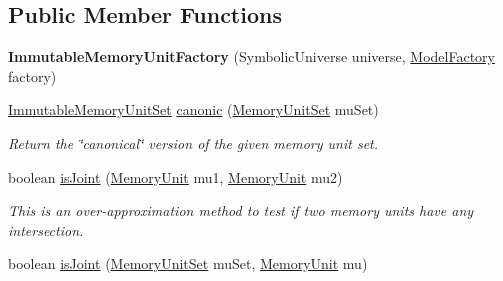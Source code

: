 \subsection*{Public Member Functions}
\begin{DoxyCompactItemize}
\item 
\hypertarget{classedu_1_1udel_1_1cis_1_1vsl_1_1civl_1_1state_1_1common_1_1immutable_1_1ImmutableMemoryUnitFactory_aa71d30215a0783c82208524f0b0f179e}{}{\bfseries Immutable\+Memory\+Unit\+Factory} (Symbolic\+Universe universe, \hyperlink{interfaceedu_1_1udel_1_1cis_1_1vsl_1_1civl_1_1model_1_1IF_1_1ModelFactory}{Model\+Factory} factory)\label{classedu_1_1udel_1_1cis_1_1vsl_1_1civl_1_1state_1_1common_1_1immutable_1_1ImmutableMemoryUnitFactory_aa71d30215a0783c82208524f0b0f179e}

\item 
\hyperlink{classedu_1_1udel_1_1cis_1_1vsl_1_1civl_1_1state_1_1common_1_1immutable_1_1ImmutableMemoryUnitSet}{Immutable\+Memory\+Unit\+Set} \hyperlink{classedu_1_1udel_1_1cis_1_1vsl_1_1civl_1_1state_1_1common_1_1immutable_1_1ImmutableMemoryUnitFactory_a3b11943ce391ee5ee59de7d853411868}{canonic} (\hyperlink{interfaceedu_1_1udel_1_1cis_1_1vsl_1_1civl_1_1state_1_1IF_1_1MemoryUnitSet}{Memory\+Unit\+Set} mu\+Set)
\begin{DoxyCompactList}\small\item\em Return the \char`\"{}canonical\char`\"{} version of the given memory unit set. \end{DoxyCompactList}\item 
boolean \hyperlink{classedu_1_1udel_1_1cis_1_1vsl_1_1civl_1_1state_1_1common_1_1immutable_1_1ImmutableMemoryUnitFactory_a678985ac788be90be3ef7be8e9c52ae4}{is\+Joint} (\hyperlink{interfaceedu_1_1udel_1_1cis_1_1vsl_1_1civl_1_1state_1_1IF_1_1MemoryUnit}{Memory\+Unit} mu1, \hyperlink{interfaceedu_1_1udel_1_1cis_1_1vsl_1_1civl_1_1state_1_1IF_1_1MemoryUnit}{Memory\+Unit} mu2)
\begin{DoxyCompactList}\small\item\em This is an over-\/approximation method to test if two memory units have any intersection. \end{DoxyCompactList}\item 
boolean \hyperlink{classedu_1_1udel_1_1cis_1_1vsl_1_1civl_1_1state_1_1common_1_1immutable_1_1ImmutableMemoryUnitFactory_a3e87e2a3a73bd681f21e05ff2ef79e67}{is\+Joint} (\hyperlink{interfaceedu_1_1udel_1_1cis_1_1vsl_1_1civl_1_1state_1_1IF_1_1MemoryUnitSet}{Memory\+Unit\+Set} mu\+Set, \hyperlink{interfaceedu_1_1udel_1_1cis_1_1vsl_1_1civl_1_1state_1_1IF_1_1MemoryUnit}{Memory\+Unit} mu)

\end{DoxyCompactItemize}
